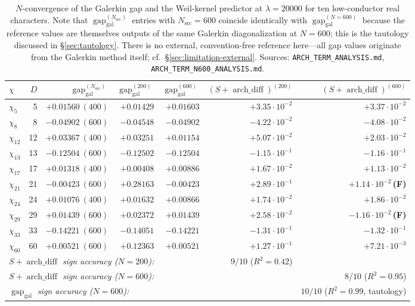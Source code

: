 \documentclass[a4paper,10pt,twocolumn]{article}
\theoremstyle{definition}
\theoremstyle{remark}
\newcommand{\gap}{\operatorname{gap}}
\newcommand{\chifn}{\chi}
\newcommand{\archdiff}{\operatorname{arch\_diff}}
\begin{document}
\begin{table}[t]
\caption{$N$-convergence of the Galerkin gap and the Weil-kernel predictor
  at $\lambda=20000$ for ten low-conductor real characters. Note that
  $\gap_{\mathrm{gal}}^{(N_{\mathrm{src}})}$ entries with $N_{\mathrm{src}}=600$
  coincide identically with $\gap_{\mathrm{gal}}^{(N=600)}$ because the
  reference values are themselves outputs of the same Galerkin
  diagonalization at $N=600$; this is the tautology discussed in
  \S\ref{sec:tautology}. There is no external, convention-free
  reference here---all gap values originate from the Galerkin method
  itself; cf.\ \S\ref{sec:limitation-external}.
  Sources: \texttt{ARCH\_TERM\_ANALYSIS.md}, \texttt{ARCH\_TERM\_N600\_ANALYSIS.md}.}
\label{tab:validation}
\centering
\small
\begin{tabular}{@{}lrrrrrr@{}}
\toprule
$\chifn$ & $D$ & $\gap_{\mathrm{gal}}^{(N_\mathrm{src})}$ & $\gap_{\mathrm{gal}}^{(200)}$ & $\gap_{\mathrm{gal}}^{(600)}$ & $(S+\archdiff)^{(200)}$ & $(S+\archdiff)^{(600)}$ \\
\midrule
$\chi_5$  &  5 & $+0.01560\ (400)$ & $+0.01429$ & $+0.01603$ & $+3.35\!\cdot\!10^{-2}$ & $+3.37\!\cdot\!10^{-2}$ \\
$\chi_8$  &  8 & $-0.04902\ (600)$ & $-0.04548$ & $-0.04902$ & $-4.22\!\cdot\!10^{-2}$ & $-4.08\!\cdot\!10^{-2}$ \\
$\chi_{12}$ & 12 & $+0.03367\ (400)$ & $+0.03251$ & $+0.01154$ & $+5.07\!\cdot\!10^{-2}$ & $+2.03\!\cdot\!10^{-2}$ \\
$\chi_{13}$ & 13 & $-0.12504\ (600)$ & $-0.12502$ & $-0.12504$ & $-1.15\!\cdot\!10^{-1}$ & $-1.16\!\cdot\!10^{-1}$ \\
$\chi_{17}$ & 17 & $+0.01318\ (400)$ & $+0.00408$ & $+0.00886$ & $+1.67\!\cdot\!10^{-2}$ & $+1.13\!\cdot\!10^{-2}$ \\
$\chi_{21}$ & 21 & $-0.00423\ (600)$ & $\mathbf{+0.28163}$ & $-0.00423$ & $+2.89\!\cdot\!10^{-1}$ & $+1.14\!\cdot\!10^{-2}$\,\textbf{(F)} \\
$\chi_{24}$ & 24 & $+0.01076\ (400)$ & $+0.01632$ & $+0.00866$ & $+1.74\!\cdot\!10^{-2}$ & $+1.86\!\cdot\!10^{-2}$ \\
$\chi_{29}$ & 29 & $+0.01439\ (600)$ & $+0.02372$ & $+0.01439$ & $+2.58\!\cdot\!10^{-2}$ & $-1.16\!\cdot\!10^{-2}$\,\textbf{(F)} \\
$\chi_{33}$ & 33 & $-0.14221\ (600)$ & $-0.14051$ & $-0.14221$ & $-1.31\!\cdot\!10^{-1}$ & $-1.32\!\cdot\!10^{-1}$ \\
$\chi_{60}$ & 60 & $+0.00521\ (600)$ & $+0.12363$ & $+0.00521$ & $+1.27\!\cdot\!10^{-1}$ & $+7.21\!\cdot\!10^{-3}$ \\
\midrule
\multicolumn{4}{l}{\textit{$S+\archdiff$ sign accuracy ($N=200$):}} & & $9/10$ ($R^2=0.42$) & \\
\multicolumn{4}{l}{\textit{$S+\archdiff$ sign accuracy ($N=600$):}} & & & $8/10$ ($R^2=0.95$) \\
\multicolumn{4}{l}{\textit{$\gap_{\mathrm{gal}}$ sign accuracy ($N=600$):}} & & & $10/10$ ($R^2=0.99$, tautology) \\
\bottomrule
\end{tabular}
\end{table}
\end{document}
